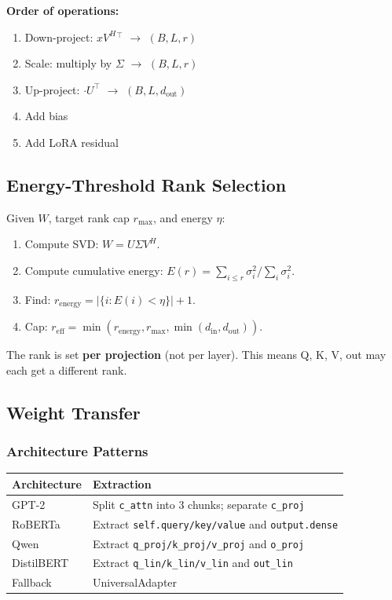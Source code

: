\textbf{Order of operations:}

\begin{enumerate}
\item Down-project: $x V^H{}^\top$ $\to$ $(B, L, r)$
\item Scale: multiply by $\Sigma$ $\to$ $(B, L, r)$
\item Up-project: $\cdot U^\top$ $\to$ $(B, L, d_\text{out})$
\item Add bias
\item Add LoRA residual

\end{enumerate}
\subsection{Energy-Threshold Rank Selection}

Given $W$, target rank cap $r_\text{max}$, and energy $\eta$:

\begin{enumerate}
\item Compute SVD: $W = U \Sigma V^H$.
\item Compute cumulative energy: $E(r) = \sum_{i \leq r} \sigma_i^2 / \sum_i \sigma_i^2$.
\item Find: $r_\text{energy} = |\{i : E(i) < \eta\}| + 1$.
\item Cap: $r_\text{eff} = \min(r_\text{energy}, r_\text{max}, \min(d_\text{in}, d_\text{out}))$.

\end{enumerate}
The rank is set \textbf{per projection} (not per layer). This means Q, K, V, out 
may each get a different rank.

\subsection{Weight Transfer}

\subsubsection{Architecture Patterns}

\begin{table}[H]
\centering
\small
\begin{tabular}{ll}
\toprule
\textbf{Architecture} & \textbf{Extraction} \\
\midrule
GPT-2 & Split \texttt{c\_attn} into 3 chunks; separate \texttt{c\_proj} \\
RoBERTa & Extract \texttt{self.query/key/value} and \texttt{output.dense} \\
Qwen & Extract \texttt{q\_proj/k\_proj/v\_proj} and \texttt{o\_proj} \\
DistilBERT & Extract \texttt{q\_lin/k\_lin/v\_lin} and \texttt{out\_lin} \\
Fallback & UniversalAdapter \\
\bottomrule
\end{tabular}
\end{table}

